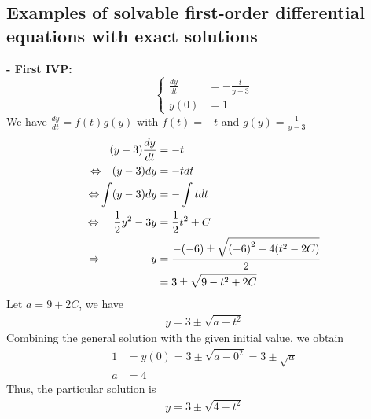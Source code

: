 \documentclass[a4paper]{article}
\numberwithin{equation}{section}
\begin{document}
\subsection{Examples of solvable first-order differential equations with exact solutions}
\textbf{- First IVP:}
\begin{equation*}
  \begin{cases}
    \frac{dy}{dt} & = - \frac{t}{y - 3} \\
    y(0)          & = 1
  \end{cases}
\end{equation*}
We have \(\frac{dy}{dt} = f(t)g(y)\) with \(f(t) = -t\) and \(g(y) = \frac{1}{y-3}\)
\begin{align*}
  (y - 3) \frac{dy}{dt}                                     & = -t                                                \\
  {\color{black}\Leftrightarrow} ~~~ (y - 3) dy             & = -t dt                                             \\
  {\color{black}\Leftrightarrow}  \int (y - 3) dy           & = -\int tdt                                         \\
  {\color{black}\Leftrightarrow} ~~~~ \frac {1}{2} y^2 - 3y & = \frac{1}{2} t^2 + C                               \\
  {\color{black}\Rightarrow} ~~~~~~~~~~~~~~ y               & = \frac{-(-6) \pm \sqrt{{(-6)}^2 - 4(t^2 - 2C)}}{2} \\
                                                            & = 3 \pm \sqrt{9 - t^2 + 2C}
\end{align*}
Let \(a = 9 + 2C\), we have
\begin{align*}
  y = 3 \pm \sqrt{a - t^2}
\end{align*}
Combining the general solution with the given initial value, we obtain
\begin{align*}
  1 & = y(0) = 3 \pm \sqrt{a - 0^2} = 3 \pm \sqrt{a} \\
  a & = 4
\end{align*}
Thus, the particular solution is
\begin{align*}
  y = 3 \pm \sqrt{4-t^2}
\end{align*}
\end{document}

